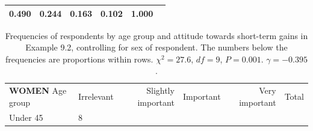 \documentclass[11pt,a4paper,openany]{book}
\begin{document}
\begin{longtable}[]{@{}lrrrrr@{}}
\begin{minipage}[t]{0.30\columnwidth}
0.490\strut
\end{minipage} & \begin{minipage}[t]{0.06\columnwidth}\raggedleft\strut
0.244\strut
\end{minipage} & \begin{minipage}[t]{0.06\columnwidth}\raggedleft\strut
0.163\strut
\end{minipage} & \begin{minipage}[t]{0.06\columnwidth}\raggedleft\strut
0.102\strut
\end{minipage} & \begin{minipage}[t]{0.04\columnwidth}\raggedleft\strut
1.000\strut
\end{minipage}\tabularnewline
\bottomrule
\end{longtable}

\begin{longtable}[]{@{}llrlrl@{}}
\caption{\label{tab:t-investors3} Frequencies of respondents by age group
and attitude towards short-term gains in Example 9.2, controlling for
sex of respondent. The numbers below the frequencies are proportions
within rows. \(\chi^{2}=27.6\), \(df=9\), \(P=0.001\).
\(\gamma=-0.395\).}\tabularnewline
\toprule
\begin{minipage}[t]{0.30\columnwidth}\raggedright\strut
\textbf{WOMEN} Age group\strut
\end{minipage} & \begin{minipage}[t]{0.30\columnwidth}\raggedright\strut
Irrelevant\strut
\end{minipage} & \begin{minipage}[t]{0.06\columnwidth}\raggedleft\strut
Slightly important\strut
\end{minipage} & \begin{minipage}[t]{0.06\columnwidth}\raggedright\strut
Important\strut
\end{minipage} & \begin{minipage}[t]{0.06\columnwidth}\raggedleft\strut
Very important\strut
\end{minipage} & \begin{minipage}[t]{0.04\columnwidth}\raggedright\strut
Total\strut
\end{minipage}\tabularnewline
\begin{minipage}[t]{0.30\columnwidth}\raggedright\strut
Under 45\strut
\end{minipage} & \begin{minipage}[t]{0.30\columnwidth}\raggedright\strut
8\strut
\end{minipage} & \begin{minipage}[t]{0.06\columnwidth}\raggedleft\strut

\end{minipage}
\end{longtable}
\end{document}
